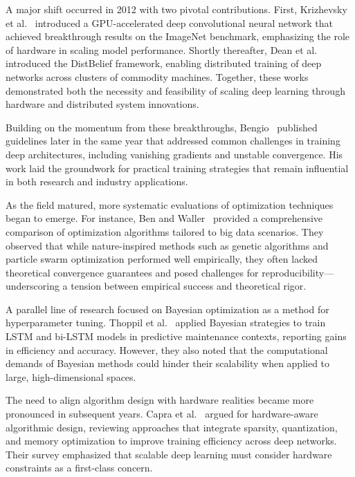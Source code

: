 \documentclass[acmsmall]{acmart}
\begin{document}
A major shift occurred in 2012 with two pivotal contributions. First, Krizhevsky et al.~\cite{krizhevsky2012imagenet} introduced a GPU-accelerated deep convolutional neural network that achieved breakthrough results on the ImageNet benchmark, emphasizing the role of hardware in scaling model performance. Shortly thereafter, Dean et al.~\cite{dean2012large} introduced the DistBelief framework, enabling distributed training of deep networks across clusters of commodity machines. Together, these works demonstrated both the necessity and feasibility of scaling deep learning through hardware and distributed system innovations.

Building on the momentum from these breakthroughs, Bengio~\cite{bengio2012practical} published guidelines later in the same year that addressed common challenges in training deep architectures, including vanishing gradients and unstable convergence. His work laid the groundwork for practical training strategies that remain influential in both research and industry applications.

As the field matured, more systematic evaluations of optimization techniques began to emerge. For instance, Ben and Waller~\cite{ben2019demystifying} provided a comprehensive comparison of optimization algorithms tailored to big data scenarios. They observed that while nature-inspired methods such as genetic algorithms and particle swarm optimization performed well empirically, they often lacked theoretical convergence guarantees and posed challenges for reproducibility—underscoring a tension between empirical success and theoretical rigor.

A parallel line of research focused on Bayesian optimization as a method for hyperparameter tuning. Thoppil et al.~\cite{thoppil2022bayesian} applied Bayesian strategies to train LSTM and bi-LSTM models in predictive maintenance contexts, reporting gains in efficiency and accuracy. However, they also noted that the computational demands of Bayesian methods could hinder their scalability when applied to large, high-dimensional spaces.

The need to align algorithm design with hardware realities became more pronounced in subsequent years. Capra et al.~\cite{capra2020hardware} argued for hardware-aware algorithmic design, reviewing approaches that integrate sparsity, quantization, and memory optimization to improve training efficiency across deep networks. Their survey emphasized that scalable deep learning must consider hardware constraints as a first-class concern.
\end{document}
